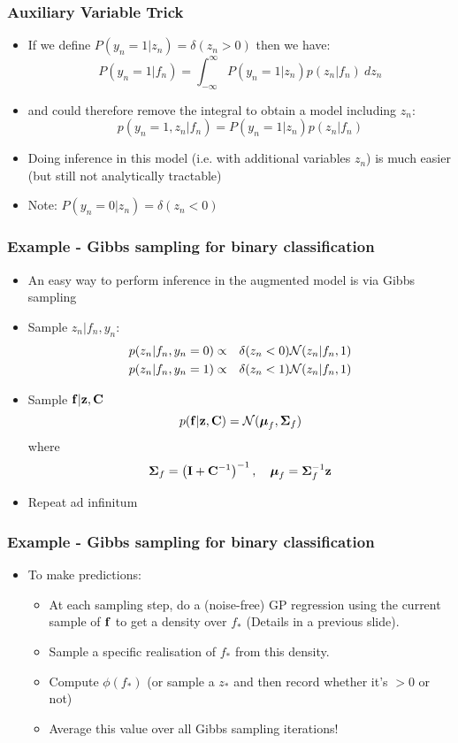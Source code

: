 \begin{frame}
	\frametitle{Auxiliary Variable Trick}
	\begin{itemize}
		\item If we define $P(y_n=1|z_n) = \delta(z_n>0)$ then we have:
		\[	
		P(y_n=1|f_n) = \int_{-\infty}^{\infty} P(y_n=1|z_n)p(z_n|f_n)~dz_n
		\]
		\item and could therefore remove the integral to obtain a model including $z_n$:
		\[
		p(y_n=1,z_n|f_n) = P(y_n=1|z_n)p(z_n|f_n)
		\]
		\item Doing inference in this model (i.e. with additional variables $z_n$) is much easier (but still not analytically tractable)
		\item Note: $P(y_n=0|z_n) = \delta(z_n<0)$
	\end{itemize}
\end{frame}

\begin{frame}
	\frametitle{Example - Gibbs sampling for binary classification}
	\begin{itemize}
		\item An easy way to perform inference in the augmented model is via Gibbs sampling
		\item Sample $z_n | f_n,y_n$:
		\begin{eqnarray}
			\nonumber p(z_n|f_n,y_n=0) &\propto& \delta(z_n<0){\cal N}(z_n|f_n,1)\\
			\nonumber p(z_n|f_n,y_n=1) &\propto& \delta(z_n<1){\cal N}(z_n|f_n,1)
		\end{eqnarray}
		\item<2->Sample $\mathbf{f} | \mathbf{z},\mathbf{C}$
		\[
			 p(\mathbf{f}|\mathbf{z},\mathbf{C}) = {\cal N}(\boldsymbol\mu_f,\boldsymbol\Sigma_f)
		\]
		where
		\[
			\boldsymbol\Sigma_f = \left(\mathbf{I} + \mathbf{C}^{-1}\right)^{-1},~~~ \boldsymbol\mu_f = \boldsymbol\Sigma_f^{-1}\mathbf{z}
		\]
		\item<2->Repeat ad infinitum
	\end{itemize}
\end{frame}

\begin{frame}
	\frametitle{Example - Gibbs sampling for binary classification}
	\begin{itemize}
		\item To make predictions:
		\begin{itemize}
			\item At each sampling step, do a (noise-free) GP regression using the current sample of $\mathbf{f}$ to get a density over $f_*$ (Details in a previous slide).
			\item Sample a specific realisation of $f_*$ from this density.
			\item Compute $\phi(f_*)$ (or sample a $z_*$ and then record whether it's $>0$ or not)
			\item Average this value over all Gibbs sampling iterations! 
		\end{itemize}
	\end{itemize}
\end{frame}

